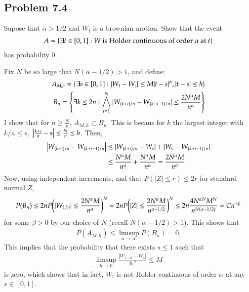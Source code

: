 \documentclass[12pt]{article}
\theoremstyle{definitionstyle}
\newcommand{\1}{\mathds 1}
\begin{document}
    \subsection*{Problem 7.4}
    Supose that $\alpha > 1/2$ and $W_t$ is a brownian motion. Show that the event
    \begin{align*}
        A = \qty{\exists t \in [0,1] : W \text{ is Holder continuous of order $\alpha$ at $t$}}
    \end{align*}
    has probability 0.

    Fix $N$ be so large that $N(\alpha - 1/2) > 1$, and define:
    \begin{align*}
        A_{M,h} = \qty{\exists s \in [0,1] : |W_t - W_s| \leq M|t-s|^\alpha, |t-s| \leq h } \\
        B_n = \qty{\exists k \leq 2n : \bigwedge_{i=1}^N |W_{(k+i)/n} - W_{(k+i-1)/n}| \leq \frac{2 N^\alpha M}{n^\alpha} }
    \end{align*} 
    I show that for $n \geq \frac{N}{h}$, $A_{M,h} \subset B_n$. This is becaus for $k$ the largest integer with $k/n \leq s$, $\qty|\frac{k+i}{n} - s| \leq \frac{N}{n} \leq h$. Then,
    \begin{align*}
        \qty|W_{(k+i)/n} - W_{(k+i-1)/n}| &\leq |W_{(k+i)/n} - W_s| + |W_s - W_{(k+i-1)/n}| \\
        &\leq \frac{N^\alpha M}{n^\alpha} + \frac{N^\alpha M}{n^\alpha} = \frac{2 N^\alpha M}{n^\alpha}
    \end{align*}
    Now, using independent increments, and that $P(|Z| \leq r) \leq 2r$ for standard normal $Z$,
    \begin{align*}
        P(B_n) \leq 2n P\qty(|W_{1/n}| \leq \frac{2 N^\alpha M}{n^\alpha})^N = 2n P\qty(|Z| \leq \frac{2 N^\alpha M}{n^{\alpha - 1/2}})^N \leq 2n \frac{4 N^{\alpha N} M^{N}}{n^{N(\alpha - 1/2)}} = C n^{-\beta}
    \end{align*}
    for some $\beta > 0$ by our choice of $N$ (recall $N(\alpha - 1/2) > 1$). This shows that 
    \begin{align*}
        P(A_{M,h}) \leq \limsup_{n \to \infty} P(B_n) = 0.
    \end{align*} This implies that the probability that there exists $s \leq 1$ such that
    \begin{align*}
        \limsup_{h \to 0} \frac{|W_{s+h} - W_s|}{|h|^\alpha} \leq M
    \end{align*}
    is zero, which shows that in fact, $W_t$ is not Holder continuous of order $\alpha$ at any $s \in [0,1]$.
\end{document}
